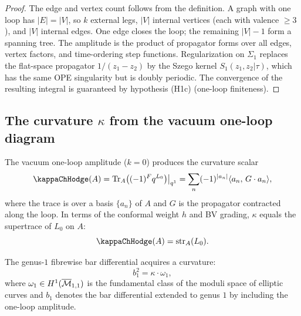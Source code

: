 \begin{proof}
The edge and vertex count follows from the definition. A graph
with one loop has $|E| = |V|$, so $k$ external legs, $|V|$
internal vertices (each with valence $\ge 3$), and $|V|$ internal
edges. One edge closes the loop; the remaining $|V| - 1$ form a
spanning tree. The amplitude is the product of propagator forms
over all edges, vertex factors, and time-ordering step functions.
Regularization on $\Sigma_1$ replaces the flat-space propagator
$1/(z_1 - z_2)$ by the Szego kernel $S_1(z_1, z_2|\tau)$, which
has the same OPE singularity but is doubly periodic. The
convergence of the resulting integral is guaranteed by
hypothesis (H1c) (one-loop finiteness).
\end{proof}

\subsection{The curvature $\kappa$ from the vacuum one-loop diagram}

\begin{theorem}
\label{thm:thqg-bv-ext-kappa}
The vacuum one-loop amplitude ($k = 0$) produces the curvature
scalar
\begin{equation}
\kappaChHodge(A)
= \Tr_{A}\bigl((-1)^F q^{L_0}\bigr)\big|_{q^1}
= \sum_{n} (-1)^{|a_n|} \langle a_n,\, G \cdot a_n \rangle,
\end{equation}
where the trace is over a basis $\{a_n\}$ of $A$ and $G$ is the
propagator contracted along the loop. In terms of the conformal
weight $h$ and BV grading, $\kappa$ equals the supertrace of
$L_0$ on $A$:
\begin{equation}
\kappaChHodge(A) = \operatorname{str}_{A}(L_0).
\end{equation}

The genus-$1$ fibrewise bar differential acquires a curvature:
\begin{equation}
b_1^2 = \kappa \cdot \omega_1,
\end{equation}
where $\omega_1 \in H^1(\overline{\mathcal{M}}_{1,1})$ is the fundamental
class of the moduli space of elliptic curves and $b_1$ denotes the
bar differential extended to genus $1$ by including the one-loop
amplitude.
\end{theorem}

